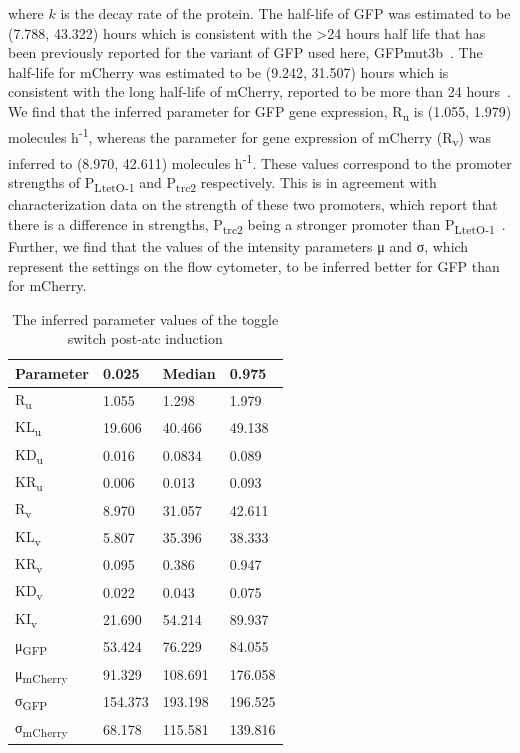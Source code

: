 \noindent where $k$ is the decay rate of the protein. The half-life of GFP was estimated to be (7.788, 43.322) hours which is consistent with the \textgreater 24 hours half life that has been previously reported for the variant of GFP used here, GFPmut3b~\autocite{Andersen:1998tn}. The half-life for mCherry was estimated to be (9.242, 31.507) hours which is consistent with the long half-life of mCherry, reported to be more than 24 hours~\autocite{Shaner:2004vy}. We find that the inferred parameter for GFP gene expression, R\textsubscript{u} is (1.055, 1.979) molecules h\textsuperscript{-1}, whereas the parameter for gene expression of mCherry (R\textsubscript{v}) was inferred to (8.970, 42.611) molecules h\textsuperscript{-1}. These values correspond to the promoter strengths of P\textsubscript{LtetO-1} and P\textsubscript{trc2} respectively. This is in agreement with characterization data on the strength of these two promoters, which report that there is a difference in strengths, P\textsubscript{trc2} being a stronger promoter than P\textsubscript{LtetO-1}~\autocite{Litcofsky:2012gr}. Further, we find that the values of the intensity parameters μ and σ, which represent the settings on the flow cytometer, to be inferred better for GFP than for mCherry. 




\begin{table}[htb]
\centering
\caption{The inferred parameter values of the toggle switch post-\acrshort{atc} induction}
\label{tab:inf_params_atc}
\begin{tabular}{@{}llll@{}}
\toprule
Parameter & 0.025 & Median & 0.975 \\ \midrule
R\textsubscript{u} & 1.055 & 1.298 & 1.979 \\
KL\textsubscript{u} & 19.606 & 40.466 & 49.138 \\
KD\textsubscript{u} & 0.016 & 0.0834 & 0.089 \\
KR\textsubscript{u} & 0.006 & 0.013 & 0.093 \\
R\textsubscript{v} & 8.970 & 31.057 & 42.611 \\
KL\textsubscript{v} & 5.807 & 35.396 & 38.333 \\
KR\textsubscript{v} & 0.095 & 0.386 & 0.947 \\
KD\textsubscript{v} & 0.022 & 0.043 & 0.075 \\
KI\textsubscript{v} & 21.690 & 54.214 & 89.937 \\
μ\textsubscript{GFP} & 53.424 & 76.229 & 84.055 \\
μ\textsubscript{mCherry} & 91.329 & 108.691 & 176.058 \\
σ\textsubscript{GFP} & 154.373 & 193.198 & 196.525 \\
σ\textsubscript{mCherry} & 68.178 & 115.581 & 139.816 \\ \bottomrule
\end{tabular}
\end{table}


